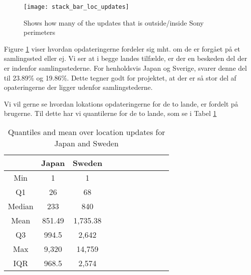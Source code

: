 \begin{figure}[H]
    \hspace*{-2.2cm}
    \centering
    \texttt{[image: stack\_bar\_loc\_updates]}
    \caption{Shows how many of the updates that is outside/inside Sony perimeters}
    \label{fig:hq_stack_bar}
\end{figure}

Figure \ref{fig:hq_stack_bar} viser hvordan opdateringerne fordeler sig mht. om de er forgået på et samlingssted eller ej. Vi ser at i begge landes tilfælde, er der en beskeden del der er indenfor samlingsstederne. For henholdsvis Japan og Sverige, svarer denne del til 23.89\% og 19.86\%. 
Dette tegner godt for projektet, at der er så stor del af opateringerne der ligger udenfor samlingstederne. 

Vi vil gerne se hvordan lokations opdateringerne for de to lande, er fordelt på brugerne. Til dette har vi quantilerne for de to lande, som se i Tabel \ref{tab:stat_loc_updates} 

\begin{table}[htbp]
        \centering
        \small
        \setlength\tabcolsep{2pt}
        \begin{tabular}{|c|c|c|c|c|c|c|c|c|c|c|}
            \hline
                         & Japan      &   Sweden      \\[-1pt]
            \hline
                 Min     &    1       &   1           \\
            \hline
                 Q1      &  26        &   68      \\
            \hline
                 Median  & 233     &   840      \\
            \hline
                 Mean    &  851.49   &  1,735.38     \\
            \hline
                 Q3      & 994.5    &   2,642     \\
            \hline
                 Max     &  9,320 &  14,759     \\
            \hline
                 IQR     &  968.5   &   2,574     \\
            \hline
            
        \end{tabular}
        \caption{Quantiles and mean over location updates for Japan and Sweden} %
        \label{tab:stat_loc_updates}
\end{table}


